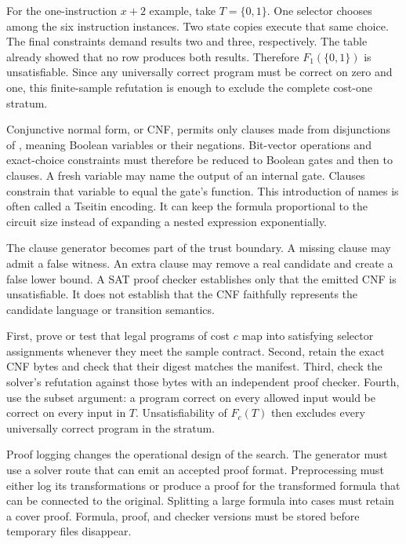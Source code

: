 For the one-instruction \(x+2\) example, take \(T=\{0,1\}\). One selector
chooses among the six instruction instances. Two state copies execute that
same choice. The final constraints demand results two and three,
respectively. The table already showed that no row produces both results.
Therefore \(F_1(\{0,1\})\) is unsatisfiable. Since any universally correct
program must be correct on zero and one, this finite-sample refutation is
enough to exclude the complete cost-one stratum.

Conjunctive normal form, or CNF, permits only clauses made from disjunctions of
, meaning Boolean variables or their negations. Bit-vector
operations and exact-choice constraints must therefore
be reduced to Boolean gates and then to clauses. A fresh variable may name the
output of an internal gate. Clauses constrain that variable to equal the
gate's function. This introduction of names is often called a Tseitin
encoding. It can keep the formula proportional to the circuit size instead of
expanding a nested expression exponentially.

The clause generator becomes part of the trust boundary. A missing clause may
admit a false witness. An extra clause may remove a real candidate and create
a false lower bound. A SAT proof checker establishes only that the emitted CNF
is unsatisfiable. It does not establish that the CNF faithfully represents
the candidate language or transition semantics.

\begin{proofkit}[title={The four links from refutation to lower bound}]
First, prove or test that legal programs of cost \(c\) map into satisfying
selector assignments whenever they meet the sample contract. Second, retain
the exact CNF bytes and check that their digest matches the manifest. Third,
check the solver's refutation against those bytes with an independent proof
checker. Fourth, use the subset argument: a program correct on every allowed
input would be correct on every input in \(T\). Unsatisfiability of
\(F_c(T)\) then excludes every universally correct program in the stratum.
\end{proofkit}

Proof logging changes the operational design of the search. The generator
must use a solver route that can emit an accepted proof format. Preprocessing
must either log its transformations or produce a proof for the transformed
formula that can be connected to the original. Splitting a large formula into
cases must retain a cover proof. Formula, proof, and checker versions must be
stored before temporary files disappear.

